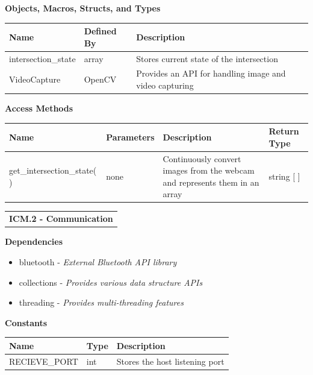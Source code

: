\documentclass [10pt]{article}
\begin{document}
\textbf{Objects, Macros, Structs, and Types}\\ 
\begin{longtable}{ |p{ }  p{ } p{}|} \hline

 \textbf{Name} & \textbf{Defined By} & \textbf{Description} \\ \hline
 \rowcolor{tableCell} intersection\_state & array & Stores current state of the intersection \\ \hline
 VideoCapture&OpenCV&Provides an API for handling image and video capturing \\ \hline
\end{longtable}

\textbf{Access Methods}\\ 


\begin{longtable}{ |p{ }  p{ } p{} p{}|} \hline

 \textbf{Name} & \textbf{Parameters} & \textbf{Description} &\textbf{Return Type} \\ \hline
 \rowcolor{tableCell} get\_intersection\_state( ) &none  &Continuously convert images from the webcam and represents them  in an array& string [ ]\\ \hline





\end{longtable}

\begin{longtable}{p{}}
\rowcolor{subsectionC}\textbf{ICM.2 - Communication} \\
\end{longtable}
  




\textbf{Dependencies } 

\begin{itemize}
    \itemsep 0pt
    \item bluetooth - \textit{External Bluetooth API library}
    \item collections - \textit{Provides various data structure APIs}
    \item threading - \textit{Provides multi-threading features}
    
\end{itemize}

\textbf{Constants}\\
\begin{longtable}{ |p{ }  p{ } p{}|}  \hline
 \textbf{Name} & \textbf{Type} & \textbf{Description} \\ \hline
\rowcolor{tableCell} RECIEVE\_PORT & int & Stores the host listening port\\ \hline
\end{longtable}
\end{document}
